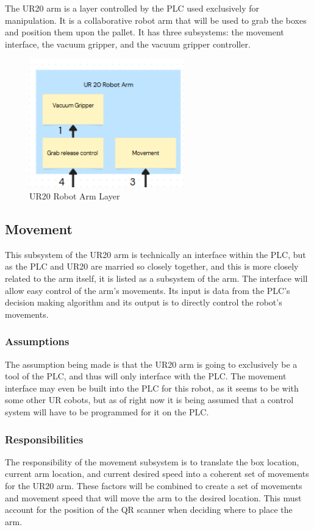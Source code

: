 The UR20 arm is a layer controlled by the PLC used exclusively for manipulation. It is a collaborative robot arm that will be used to grab the boxes and position them upon the pallet. It has three subsystems: the movement interface, the vacuum gripper, and the vacuum gripper controller.

\begin{figure}[h!]
	\centering
 	\includegraphics[width=0.60\textwidth]{images/UR20_ARM}
 \caption{UR20 Robot Arm Layer}
\end{figure}

\subsection{Movement}
This subsystem of the UR20 arm is technically an interface within the PLC, but as the PLC and UR20 are married so closely together, and this is more closely related to the arm itself, it is listed as a subsystem of the arm. The interface will allow easy control of the arm's movements. Its input is data from the PLC's decision making algorithm and its output is to directly control the robot's movements.

\subsubsection{Assumptions}
The assumption being made is that the UR20 arm is going to exclusively be a tool of the PLC, and thus will only interface with the PLC. The movement interface may even be built into the PLC for this robot, as it seems to be with some other UR cobots, but as of right now it is being assumed that a control system will have to be programmed for it on the PLC.

\subsubsection{Responsibilities}
The responsibility of the movement subsystem is to translate the box location, current arm location, and current desired speed into a coherent set of movements for the UR20 arm. These factors will be combined to create a set of movements and movement speed that will move the arm to the desired location. This must account for the position of the QR scanner when deciding where to place the arm.

